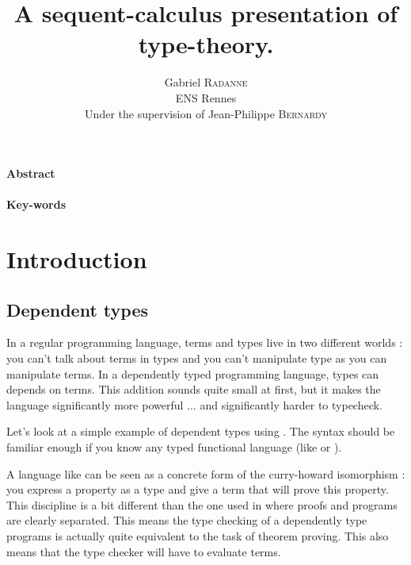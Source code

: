 \documentclass[11pt]{scrartcl}
\title{A sequent-calculus presentation of type-theory.}
\author{
  Gabriel \textsc{Radanne}\\
  \large\textsc{ENS} Rennes\\
  \normalsize Under the supervision of Jean-Philippe \textsc{Bernardy}
}
\begin{document}
\begin{titlepage}

  \maketitle
  \thispagestyle{empty}

  \paragraph{Abstract}



  \paragraph{Key-words}

\end{titlepage}

\section{Introduction}


\subsection{Dependent types}
\label{sec:dependent-types}

In a regular programming language, terms and types live in two different worlds : you can't talk about terms in types and you can't manipulate type as you can manipulate terms. In a dependently typed programming language, types can depends on terms. This addition sounds quite small at first, but it makes the language significantly more powerful ... and significantly harder to typecheck.

Let's look at a simple example of dependent types using . The syntax should be familiar enough if you know any typed functional language (like  or ).


A language like  can be seen as a concrete form of the curry-howard isomorphism : you express a property as a type and give a term that will prove this property. This discipline is a bit different than the one used in  where proofs and programs are clearly separated.
This means the type checking of a dependently type programs is actually quite equivalent to the task of theorem proving. This also means that the type checker will have to evaluate terms.
\end{document}
